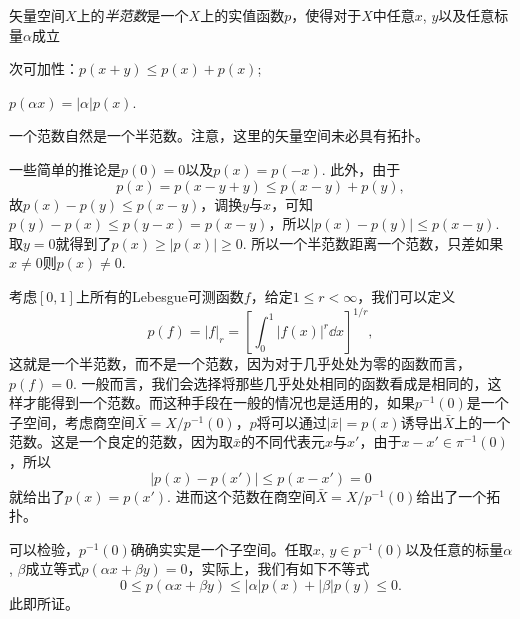\begin{para}
矢量空间$X$上的\textit{半范数}是一个$X$上的实值函数$p$，使得对于$X$中任意$x$, $y$以及任意标量$\alpha$成立
\begin{compactenum}
\item 次可加性：$p(x+y)\leq p(x)+p(x)$;
\item $p(\alpha x)=|\alpha|p(x)$.
\end{compactenum}
一个范数自然是一个半范数。注意，这里的矢量空间未必具有拓扑。

一些简单的推论是$p(0)=0$以及$p(x)=p(-x)$. 此外，由于
\[
	p(x)=p(x-y+y)\leq p(x-y)+p(y),
\]
故$p(x)-p(y)\leq p(x-y)$，调换$y$与$x$，可知$p(y)-p(x)\leq p(y-x)=p(x-y)$，所以$|p(x)-p(y)|\leq p(x-y)$. 取$y=0$就得到了$p(x)\geq |p(x)|\geq 0$. 所以一个半范数距离一个范数，只差如果$x\neq 0$则$p(x)\neq 0$.

考虑$[0,1]$上所有的Lebesgue可测函数$f$，给定$1\leq r<\infty$，我们可以定义
\[
	p(f)=|f|_r=\left[\int_{0}^{1}|f(x)|^r\dd x\right]^{1/r},
\]
这就是一个半范数，而不是一个范数，因为对于几乎处处为零的函数而言，$p(f)=0$. 一般而言，我们会选择将那些几乎处处相同的函数看成是相同的，这样才能得到一个范数。而这种手段在一般的情况也是适用的，如果$p^{-1}(0)$是一个子空间，考虑商空间$\bar{X}=X/p^{-1}(0)$，$p$将可以通过$|\bar{x}|=p(x)$诱导出$\bar{X}$上的一个范数。这是一个良定的范数，因为取$\bar{x}$的不同代表元$x$与$x'$，由于$x-x'\in \pi^{-1}(0)$，所以
\[
	|p(x)-p(x')|\leq p(x-x')=0
\]
就给出了$p(x)=p(x')$. 进而这个范数在商空间$\bar{X}=X/p^{-1}(0)$给出了一个拓扑。

可以检验，$p^{-1}(0)$确确实实是一个子空间。任取$x$, $y\in p^{-1}(0)$以及任意的标量$\alpha$, $\beta$成立等式$p(\alpha x+\beta y)=0$，实际上，我们有如下不等式
\[
	0\leq p(\alpha x+\beta y)\leq |\alpha|p(x)+|\beta|p(y)\leq 0.
\]
此即所证。
\end{para}




